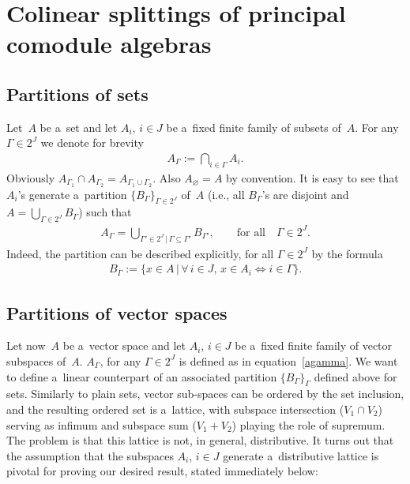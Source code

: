 \section{Colinear splittings of principal comodule algebras}\label{partitions-s}

\subsection{Partitions of sets}

Let~$A$ be a~set and let $A_i$, $i\in J$ be a~f\/ixed f\/inite family of subsets of~$A$.
For any $\Gamma\in 2^J$ we denote for brevity
\begin{gather}
\label{agamma}
A_\Gamma:=\bigcap_{i\in \Gamma}A_i.
\end{gather}
Obviously $A_{\Gamma_1}\cap A_{\Gamma_2}=A_{\Gamma_1\cup\Gamma_2}$.
Also $A_\varnothing = A$ by convention.
It is easy to see that $A_i$'s generate a~partition $\{B_\Gamma\}_{\Gamma\in 2^J}$ of~$A$ (i.e., all $B_\Gamma$'s are
disjoint and $A=\bigcup_{\Gamma\in2^J}B_\Gamma$) such that
\begin{gather*}
A_\Gamma=\bigcup_{\Gamma'\in2^J
\,| \,
\Gamma\subseteq\Gamma'}B_{\Gamma'},
\qquad
\text{for all}
\quad
\Gamma\in 2^J.
\end{gather*}
Indeed, the partition can be described explicitly, for all $\Gamma\in2^J$ by the formula
\begin{gather*}
B_\Gamma
:=\{x\in A
\,|\,
\forall\, i\in J,\,
x\in A_i\Leftrightarrow i\in \Gamma\}.
\end{gather*}

\subsection{Partitions of vector spaces}

Let now~$A$ be a~vector space and let $A_i$, $i\in J$ be a~f\/ixed f\/inite family of vector subspaces of~$A$.
$A_\Gamma$, for any $\Gamma\in 2^J$ is def\/ined as in equation~\eqref{agamma}.
We want to def\/ine a~linear counterpart of an associated partition $\{B_\Gamma\}_\Gamma$ def\/ined above for sets.
Similarly to plain sets, vector sub-spaces can be ordered by the set inclusion, and the resulting ordered set is
a~lattice, with subspace intersection ($V_1\cap V_2$) serving as inf\/imum and subspace sum ($V_1+V_2$) playing the role
of supremum.
The problem is that this lattice is not, in general, distributive.
It turns out that the assumption that the subspaces $A_i$, $i\in J$ generate a~distributive lattice is pivotal for
proving our desired result, stated immediately below:

